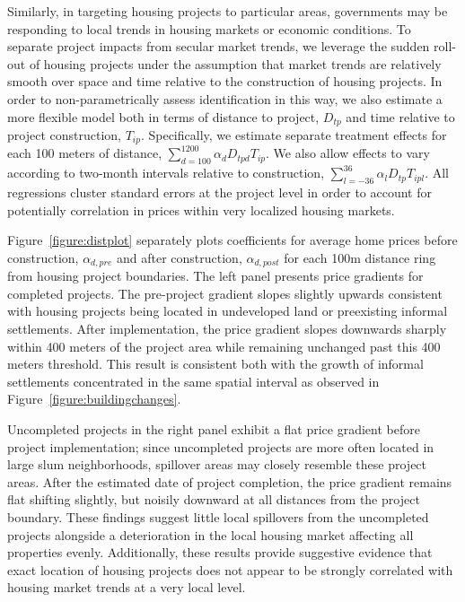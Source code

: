 \documentclass[12pt]{article}
\begin{document}
Similarly, in targeting housing projects to particular areas, governments may be responding to local trends in housing markets or economic conditions.  To separate project impacts from secular market trends, we leverage the sudden roll-out of housing projects under the assumption that market trends are relatively smooth over space and time relative to the construction of housing projects.  In order to non-parametrically assess identification in this way, we also estimate a more flexible model both in terms of distance to project, $D_{tp}$ and time relative to project construction, $T_{ip}$.  Specifically, we estimate separate treatment effects for each 100 meters of distance, $\sum_{d=100}^{1200} \alpha_d D_{tpd} T_{ip}$.  We also allow effects to vary according to two-month intervals relative to construction, $\sum_{l=-36}^{36} \alpha_l D_{tp}T_{ipl}$.  All regressions cluster standard errors at the project level in order to account for potentially correlation in prices within very localized housing markets.

Figure~\ref{figure:distplot} separately plots coefficients for average home prices before construction, $\alpha_{d,pre}$ and after construction, $\alpha_{d,post}$ for each 100m distance ring from housing project boundaries.  The left panel presents price gradients for completed projects.  The pre-project gradient slopes slightly upwards consistent with housing projects being located in undeveloped land or preexisting informal settlements.  After implementation, the price gradient slopes downwards sharply within 400 meters of the project area while remaining unchanged past this 400 meters threshold.  This result is consistent both with the growth of informal settlements concentrated in the same spatial interval as observed in Figure~\ref{figure:buildingchanges}.

Uncompleted projects in the right panel exhibit a flat price gradient before project implementation; since uncompleted projects are more often located in large slum neighborhoods, spillover areas may closely resemble these project areas.  After the estimated date of project completion, the price gradient remains flat shifting slightly, but noisily downward at all distances from the project boundary.  These findings suggest little local spillovers from the uncompleted projects alongside a deterioration in the local housing market affecting all properties evenly.  Additionally, these results provide suggestive evidence that exact location of housing projects does not appear to be strongly correlated with housing market trends at a very local level.
\end{document}
